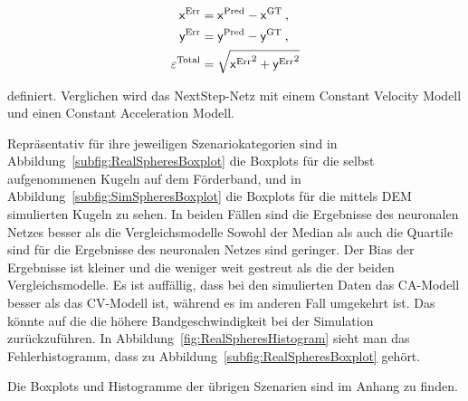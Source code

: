 \begin{align*}
    \mathsf{x}{^{\text{Err}}} &=  \mathsf{x}{^{\text{Pred}}} -  \mathsf{x}{^{\text{GT}}} \: ,\\
    \mathsf{y}{^{\text{Err}}} &=  \mathsf{y}{^{\text{Pred}}} -  \mathsf{y}{^{\text{GT}}} \: ,\\
    \varepsilon{^{\text{Total}}} &= \sqrt{ \mathsf{x}{^{\text{Err}}}^2 +  \mathsf{y}{^{\text{Err}}}^2}
\end{align*}

definiert. Verglichen wird das NextStep-Netz mit einem Constant Velocity Modell und einen Constant Acceleration Modell.

Repräsentativ für ihre jeweiligen Szenariokategorien sind in Abbildung~\ref{subfig:RealSpheresBoxplot} die Boxplots für die selbst aufgenommenen Kugeln auf dem Förderband,
und in Abbildung~\ref{subfig:SimSpheresBoxplot} die Boxplots für die mittels DEM simulierten Kugeln zu sehen.
In beiden Fällen sind die Ergebnisse des neuronalen Netzes besser als die Vergleichsmodelle
Sowohl der Median als auch die Quartile sind für die Ergebnisse des neuronalen Netzes sind geringer.
Der Bias der Ergebnisse ist kleiner und die weniger weit gestreut als die der beiden Vergleichsmodelle.
Es ist auffällig, dass bei den simulierten Daten das CA-Modell besser als das CV-Modell ist, während es im anderen Fall umgekehrt ist.
Das könnte auf die die höhere Bandgeschwindigkeit bei der Simulation zurückzuführen. 
In Abbildung~\ref{fig:RealSpheresHistogram} sieht man das Fehlerhistogramm, dass zu Abbildung~\ref{subfig:RealSpheresBoxplot} gehört.




Die Boxplots und Histogramme der übrigen Szenarien sind im Anhang zu finden.

